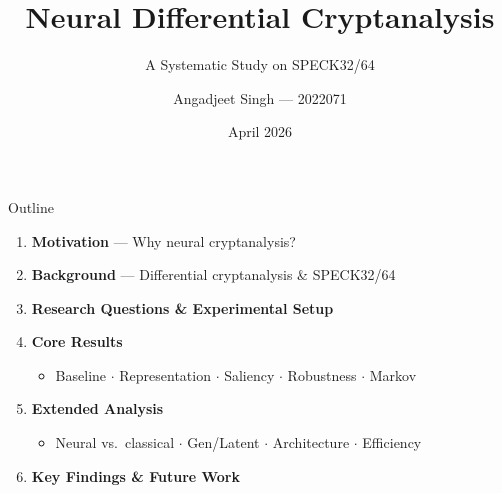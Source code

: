 \documentclass[aspectratio=169, 10pt]{beamer}
\title{Neural Differential Cryptanalysis}
\subtitle{A Systematic Study on SPECK32/64}
\author{Angadjeet Singh --- 2022071}
\institute{Applied Cryptography \\ Department of CSE, IIIT Delhi}
\date{April 2026}
\begin{document}
\begin{frame}[plain]
  \titlepage
\end{frame}

\begin{frame}{Outline}
\small
\begin{enumerate}
  \setlength{\itemsep}{0.2cm}
  \item \textbf{Motivation} --- Why neural cryptanalysis?
  \item \textbf{Background} --- Differential cryptanalysis \& SPECK32/64
  \item \textbf{Research Questions \& Experimental Setup}
  \item \textbf{Core Results}
  \begin{itemize}
    \item Baseline $\cdot$ Representation $\cdot$ Saliency $\cdot$ Robustness $\cdot$ Markov
  \end{itemize}
  \item \textbf{Extended Analysis}
  \begin{itemize}
    \item Neural vs.\ classical $\cdot$ Gen/Latent $\cdot$ Architecture $\cdot$ Efficiency
  \end{itemize}
  \item \textbf{Key Findings \& Future Work}
\end{enumerate}
\end{frame}
\end{document}
